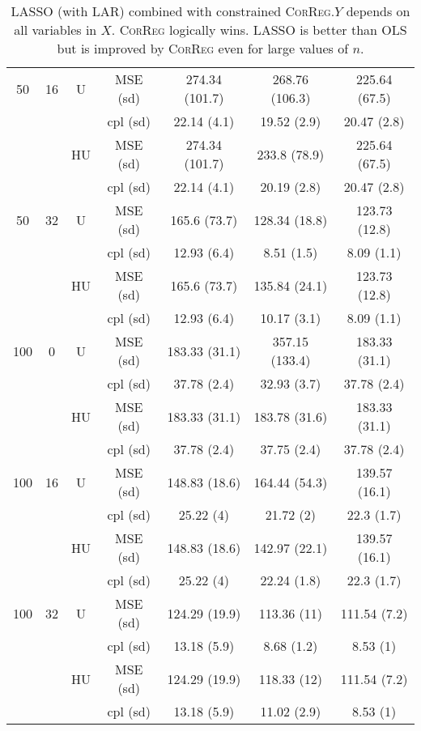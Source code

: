 \documentclass[11pt,a4paper]{article}
\begin{document}
\begin{table}[h!]
\begin{tabular}{|c|c|c|c|c|c|c|}
\hline %
50 & 16 & U&MSE (sd) & 274.34 (101.7) & 268.76 (106.3) & 225.64 (67.5) \\	
& & & cpl (sd) & 22.14 (4.1) & 19.52 (2.9) & 20.47 (2.8) \\
 &  &HU &MSE (sd) & 274.34 (101.7) & 233.8 (78.9) & 225.64 (67.5) \\
& & & cpl (sd) & 22.14 (4.1) & 20.19 (2.8) & 20.47 (2.8) \\
\hline %
50 & 32 & U&MSE (sd) & 165.6 (73.7) & 128.34 (18.8) & 123.73 (12.8) \\
& & & cpl (sd) & 12.93 (6.4) & 8.51 (1.5) & 8.09 (1.1) \\
 &  &HU &MSE (sd) & 165.6 (73.7) & 135.84 (24.1) & 123.73 (12.8) \\
& & &cpl (sd) & 12.93 (6.4) & 10.17 (3.1) & 8.09 (1.1) \\
\hline
\hline %
100 & 0 & U&  MSE (sd) & 183.33 (31.1) & 357.15 (133.4) & 183.33 (31.1) \\
& & & cpl (sd) & 37.78 (2.4) & 32.93 (3.7) & 37.78 (2.4) \\
 &  &HU &  MSE (sd) & 183.33 (31.1) & 183.78 (31.6) & 183.33 (31.1) \\
& & &  cpl (sd) & 37.78 (2.4) & 37.75 (2.4) & 37.78 (2.4) \\
\hline %
100 & 16 & U& MSE (sd) & 148.83 (18.6) & 164.44 (54.3) & 139.57 (16.1) \\
& & & cpl (sd) & 25.22 (4) & 21.72 (2) & 22.3 (1.7) \\
 &  &HU &  MSE (sd) & 148.83 (18.6) & 142.97 (22.1) & 139.57 (16.1) \\
& & & cpl (sd) & 25.22 (4) & 22.24 (1.8) & 22.3 (1.7) \\
\hline %
100 & 32 & U& MSE (sd) & 124.29 (19.9) & 113.36 (11) & 111.54 (7.2) \\
& & & cpl (sd) & 13.18 (5.9) & 8.68 (1.2) & 8.53 (1) \\
 &  &HU & MSE (sd) & 124.29 (19.9) & 118.33 (12) & 111.54 (7.2) \\
& & & cpl (sd) & 13.18 (5.9) & 11.02 (2.9) & 8.53 (1) \\
\hline
\end{tabular} 
\caption{LASSO (with LAR) combined with constrained \textsc{CorReg}.$Y$  depends on all variables in $X$. \textsc{CorReg} logically wins. LASSO is better than OLS but is improved by \textsc{CorReg} even for large values of $n$.}\label{YXlinLASSO}
\end{table}
\end{document}
